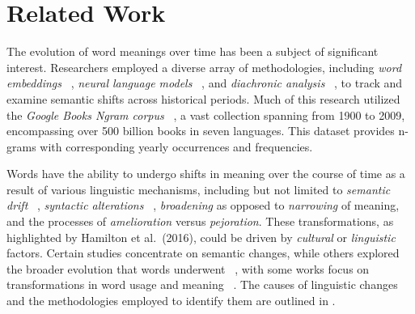 
\section{Related Work} \label{sec:relatedwork}
The evolution of word meanings over time has been a subject of significant interest.
Researchers employed a diverse array of methodologies, including \emph{word embeddings} ~\cite{kulkarni2014statisticallysignificantdetectionlinguistic},
\emph{neural language models} ~\cite{kim-etal-2014-temporal}, and \emph{diachronic analysis} ~\cite{hamilton-etal-2016-diachronic, kutuzov-etal-2018-diachronic},
to track and examine semantic shifts across historical periods.
Much of this research utilized the \emph{Google Books Ngram corpus}
~\cite{gulordava-baroni-2011-distributional, kim-etal-2014-temporal, kulkarni2014statisticallysignificantdetectionlinguistic, 10.1007/978-3-319-50496-4_18, hamilton-etal-2016-cultural, hamilton-etal-2016-diachronic, kutuzov-etal-2018-diachronic},
a vast collection spanning from 1900 to 2009,
encompassing over 500 billion books in seven languages.
This dataset provides n-grams with corresponding yearly occurrences and frequencies.

Words have the ability to undergo shifts in meaning over the course of time as a result of various linguistic mechanisms,
including but not limited to \emph{semantic drift} ~\cite{gulordava-baroni-2011-distributional, kulkarni2014statisticallysignificantdetectionlinguistic},
\emph{syntactic alterations} ~\cite{kulkarni2014statisticallysignificantdetectionlinguistic, hamilton-etal-2016-cultural},
\emph{broadening} as opposed to \emph{narrowing} of meaning, and the processes of \emph{amelioration} versus \emph{pejoration}.
These transformations, as highlighted by Hamilton et al.\ (2016), could be driven by \emph{cultural} or \emph{linguistic} factors.
Certain studies concentrate on semantic changes, while others explored the broader evolution that words underwent ~\cite{kim-etal-2014-temporal}, with some works focus on transformations in word usage and meaning ~\cite{gulordava-baroni-2011-distributional, kulkarni2014statisticallysignificantdetectionlinguistic, hamilton-etal-2016-cultural}.
The causes of linguistic changes and the methodologies employed to identify them are outlined in .

